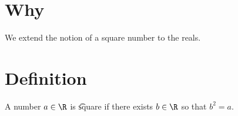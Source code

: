 

\section*{Why}

We extend the notion of a square number to the reals.

\section*{Definition}

A number $a \in \R $ is \t{square} if there exists $b \in \R $ so that $b^2 = a$.

\blankpage